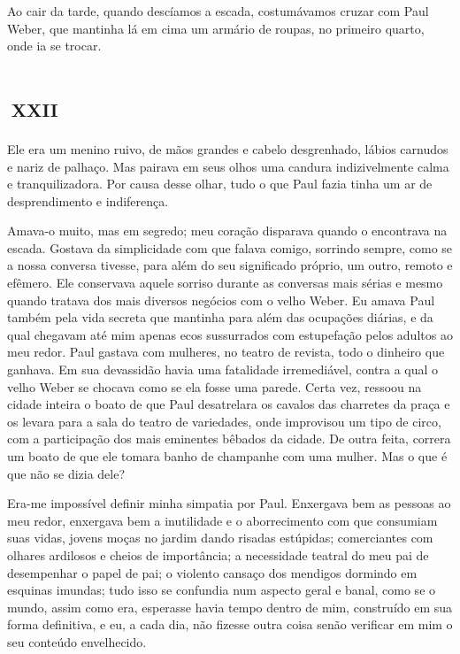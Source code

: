 Ao cair da tarde, quando descíamos a escada, costumávamos cruzar com Paul Weber, que mantinha lá em cima um armário de roupas, no primeiro quarto, onde ia se trocar.


\chapter*{\small{}\,\Large\centering\textsc{xxii}\,\small{}}

Ele era um menino ruivo, de mãos grandes e cabelo desgrenhado, lábios carnudos e nariz de palhaço. Mas pairava em seus olhos uma candura indizivelmente calma e tranquilizadora. Por causa desse olhar, tudo o que Paul fazia tinha um ar de desprendimento e indiferença.

Amava-o muito, mas em segredo; meu coração disparava quando o encontrava na escada. Gostava da simplicidade com que falava comigo, sorrindo sempre, como se a nossa conversa tivesse, para além do seu significado próprio, um outro, remoto e efêmero. Ele conservava aquele sorriso durante as conversas mais sérias e mesmo quando tratava dos mais diversos negócios com o velho Weber. Eu amava Paul também pela vida secreta que mantinha para além das ocupações diárias, e da qual chegavam até mim apenas ecos sussurrados com estupefação pelos adultos ao meu redor. Paul gastava com mulheres, no teatro de revista, todo o dinheiro que ganhava. Em sua devassidão havia uma fatalidade irremediável, contra a qual o velho Weber se chocava como se ela fosse uma parede. Certa vez, ressoou na cidade inteira o boato de que Paul desatrelara os cavalos das charretes da praça e os levara para a sala do teatro de variedades, onde improvisou um tipo de circo, com a participação dos mais eminentes bêbados da cidade. De outra feita, correra um boato de que ele tomara banho de champanhe com uma mulher. Mas o que é que não se dizia dele? 

Era-me impossível definir minha simpatia por Paul. Enxergava bem as pessoas ao meu redor, enxergava bem a inutilidade e o aborrecimento com que consumiam suas vidas, jovens moças no jardim dando risadas estúpidas; comerciantes com olhares ardilosos e cheios de importância; a necessidade teatral do meu pai de desempenhar o papel de pai; o violento cansaço dos mendigos dormindo em esquinas imundas; tudo isso se confundia num aspecto geral e banal, como se o mundo, assim como era, esperasse havia tempo dentro de mim, construído em sua forma definitiva, e eu, a cada dia, não fizesse outra coisa senão verificar em mim o seu conteúdo envelhecido.

